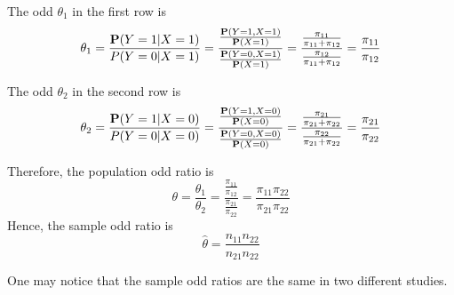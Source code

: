 The odd $\theta_1$ in the first row is 
\[\theta_1 = \frac{\P(Y = 1 | X = 1)}{P(Y = 0 | X = 1)} = \frac{\frac{\P(Y = 1, X = 1)}{\P(X = 1)}}{\frac{\P(Y = 0, X = 1)}{\P(X = 1)}} = \frac{\frac{\pi_{11}}{\pi_{11} + \pi_{12}}}{\frac{\pi_{12}}{\pi_{11} + \pi_{12}}} = \frac{\pi_{11}}{\pi_{12}}\]

The odd $\theta_2$ in the second row is 
\[\theta_2 = \frac{\P(Y = 1 | X = 0)}{P(Y = 0 | X = 0)} = \frac{\frac{\P(Y = 1, X = 0)}{\P(X = 0)}}{\frac{\P(Y = 0, X = 0)}{\P(X = 0)}} = \frac{\frac{\pi_{21}}{\pi_{21} + \pi_{22}}}{\frac{\pi_{22}}{\pi_{21} + \pi_{22}}} = \frac{\pi_{21}}{\pi_{22}}\]

Therefore, the population odd ratio is
\[\theta = \frac{\theta_1}{\theta_2} = \frac{\frac{\pi_{11}}{\pi_{12}}}{\frac{\pi_{21}}{\pi_{22}}} = \frac{\pi_{11}\pi_{22}}{\pi_{21}\pi_{22}}\]
Hence, the sample odd ratio is
\[\hat{\theta} = \frac{n_{11}n_{22}}{n_{21}n_{22}}\]

One may notice that the sample odd ratios are the same in two different studies.